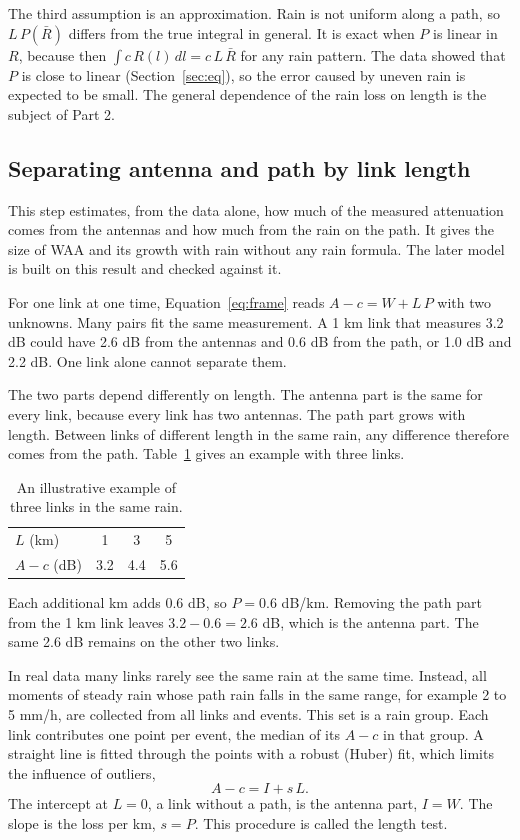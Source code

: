 \documentclass[11pt,a4paper]{article}
\newcommand{\Rb}{\bar{R}}
\newcommand{\head}[1]{\par\medskip\noindent{\sffamily #1}\quad}
\begin{document}
The third assumption is an approximation. Rain is not uniform along a path, so $L\,P(\Rb)$ differs from the true integral in
general. It is exact when $P$ is linear in $R$, because then $\int c\,R(l)\,dl = c\,L\,\Rb$ for any rain pattern. The data
showed that $P$ is close to linear (Section~\ref{sec:eq}), so the error caused by uneven rain is expected to be small. The
general dependence of the rain loss on length is the subject of Part 2.

\subsection{Separating antenna and path by link length}
\label{sec:length}
\head{Aim.} This step estimates, from the data alone, how much of the measured attenuation comes from the antennas and how much
from the rain on the path. It gives the size of WAA and its growth with rain without any rain formula. The later model is
built on this result and checked against it.

\head{The problem.} For one link at one time, Equation~\ref{eq:frame} reads $A - c = W + L\,P$ with two unknowns. Many pairs fit
the same measurement. A 1 km link that measures 3.2 dB could have 2.6 dB from the antennas and 0.6 dB from the path, or 1.0 dB
and 2.2 dB. One link alone cannot separate them.

\head{The idea.} The two parts depend differently on length. The antenna part is the same for every link, because every link
has two antennas. The path part grows with length. Between links of different length in the same rain, any difference therefore
comes from the path. Table~\ref{tab:example} gives an example with three links.

\begin{table}[H]
\centering
\caption{An illustrative example of three links in the same rain.}
\label{tab:example}
\begin{tabular}{lccc}
\toprule
$L$ (km) & 1 & 3 & 5\\
$A - c$ (dB) & 3.2 & 4.4 & 5.6\\
\bottomrule
\end{tabular}
\end{table}

Each additional km adds 0.6 dB, so $P = 0.6$ dB/km. Removing the path part from the 1 km link leaves $3.2 - 0.6 = 2.6$ dB, which
is the antenna part. The same 2.6 dB remains on the other two links.

\head{Method.} In real data many links rarely see the same rain at the same time. Instead, all moments of steady rain whose path
rain falls in the same range, for example 2 to 5 mm/h, are collected from all links and events. This set is a rain group. Each
link contributes one point per event, the median of its $A - c$ in that group. A straight line is fitted through the points with
a robust (Huber) fit, which limits the influence of outliers,
\begin{equation}
A - c = I + s\,L.
\label{eq:line}
\end{equation}
The intercept at $L = 0$, a link without a path, is the antenna part, $I = W$. The slope is the loss per km, $s = P$. This
procedure is called the length test.
\end{document}
